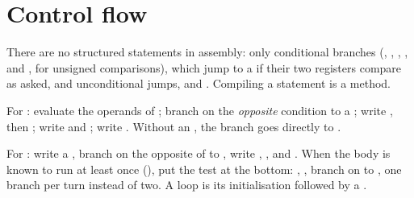 \label{lst:b2:assembly-and-calling-convention:strlen}


\label{lst:b2:assembly-and-calling-convention:struct}


\section{Control flow}\label{sec:b2:assembly-and-calling-convention:control}

There are no structured statements in assembly: only conditional branches (, , ,
, and ,  for unsigned comparisons), which jump to a  if their two registers
compare as asked, and unconditional jumps,  and . Compiling a statement is a method.

\begin{method}[Compiling an if]\label{met:b2:assembly-and-calling-convention:compile-if}
For : evaluate the operands of ; branch on the \emph{opposite} condition to a 
; write , then ; write  and ; write . Without an
, the branch goes directly to .
\end{method}

\begin{method}\label{met:b2:assembly-and-calling-convention:compile-loop}
For : write a  , branch on the opposite of  to , write ,
, and . When the body is known to run at least once (), put the test at
the bottom: , , branch on  to , one branch per turn instead of two. A
 loop is its initialisation followed by a .
\end{method}

